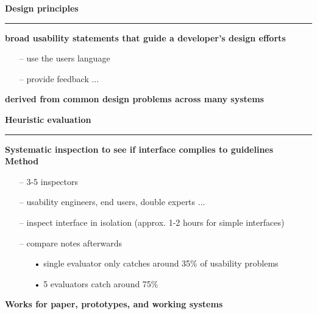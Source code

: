 \documentclass[pdf]{beamer}
\begin{document}
\begin{frame}
{\textbf{Design principles}}{\textcolor{red}{\rule{12cm}{1.2pt}}}

\textbf{broad usability statements that guide a developer's design efforts}
    \\
    \begin{itemize}
    	\item[--] use the users language
        \item[--] provide feedback ...
    \end{itemize}
    \bigskip
\textbf{derived from common design problems across many systems}
    \vspace{100px}
\end{frame}



\begin{frame}
{\textbf{Heuristic evaluation}}{\textcolor{red}{\rule{12cm}{1.2pt}}}

    \textbf{Systematic inspection to see if interface complies to guidelines}
    \bigskip
    \\
    \textbf{Method}
    \begin{itemize}
    	\item[--] 3-5 inspectors
        \item[--] usability engineers, end users, double experts ...
        \item[--] inspect interface in isolation (approx. 1-2 hours for simple interfaces)
        \item[--] compare notes afterwards
        \begin{itemize}
        	\item[\textcolor{black}{•}] single evaluator only catches around 35\% of usability problems
            \item[\textcolor{black}{•}] 5 evaluators catch around 75\%
        \end{itemize}
    \end{itemize}
    \bigskip
    \textbf{Works for paper, prototypes, and working systems}
    \vspace{40px}

\end{frame}
\end{document}
